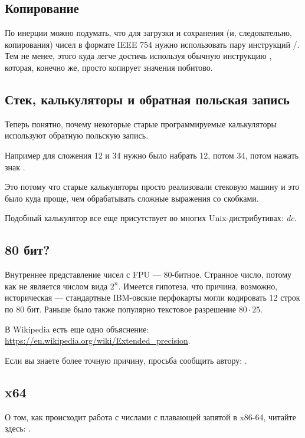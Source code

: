 \subsection{Копирование}

По инерции можно подумать, что для загрузки и сохранения (и, следовательно, копирования) чисел в формате
IEEE 754 нужно использовать пару инструкций /.
Тем не менее, этого куда легче достичь используя обычную инструкцию ,
которая, конечно же, просто копирует значения побитово.

\subsection{Стек, калькуляторы и обратная польская запись}

Теперь понятно, почему некоторые старые программируемые калькуляторы используют обратную польскую запись.

Например для сложения 12 и 34 нужно было набрать 12, потом 34, потом нажать знак .

Это потому что старые калькуляторы просто реализовали стековую машину и это было куда проще, чем обрабатывать сложные выражения со скобками.

Подобный калькулятор все еще присутствует во многих Unix-дистрибутивах: \emph{dc}.

\subsection{80 бит?}

Внутреннее представление чисел с FPU --- 80-битное.
Странное число, потому как не является числом вида $2^n$.
Имеется гипотеза, что причина, возможно, историческая --- стандартные IBM-овские перфокарты могли кодировать 12 строк по 80 бит.
Раньше было также популярно текстовое разрешение $80 \cdot 25$.

В Wikipedia есть еще одно объяснение: \url{https://en.wikipedia.org/wiki/Extended_precision}.

Если вы знаете более точную причину, просьба сообщить автору: \EMAIL{}.

\subsection{x64}

О том, как происходит работа с числами с плавающей запятой в x86-64, читайте здесь: .



